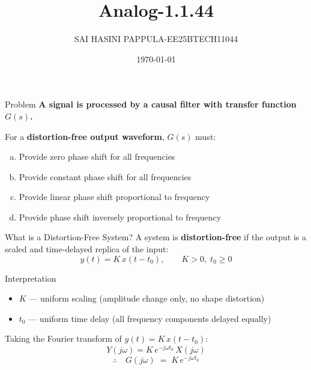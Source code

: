 \documentclass{beamer}
\title{Analog-1.1.44}
\author{SAI HASINI PAPPULA-EE25BTECH11044}
\date{\today}
\begin{document}
\begin{frame}
  \titlepage
\end{frame}

\begin{frame}{Problem}
\textbf{A signal is processed by a causal filter with transfer function $G(s)$.}

\vspace{0.8em}
For a \textbf{distortion-free output waveform}, $G(s)$ must:

\vspace{0.5em}
\begin{enumerate}[(a)]
  \item Provide zero phase shift for all frequencies
  \item Provide constant phase shift for all frequencies
  \item Provide linear phase shift proportional to frequency
  \item Provide phase shift inversely proportional to frequency
\end{enumerate}
\end{frame}

\begin{frame}{What is a Distortion-Free System?}
A system is \textbf{distortion-free} if the output is a scaled and time-delayed
replica of the input:
\[
  y(t) = K\,x(t - t_0), \qquad K > 0,\; t_0 \geq 0
\]

\vspace{0.5em}
\begin{block}{Interpretation}
\begin{itemize}
  \item $K$ — uniform scaling (amplitude change only, no shape distortion)
  \item $t_0$ — uniform time delay (all frequency components delayed equally)
\end{itemize}
\end{block}

\vspace{0.5em}
Taking the Fourier transform of $y(t) = K\,x(t-t_0)$:
\[
  Y(j\omega) = K\,e^{-j\omega t_0}\,X(j\omega)
\]
\[
  \therefore\quad G(j\omega) \;=\; K\,e^{-j\omega t_0}
\]
\end{frame}
\end{document}
